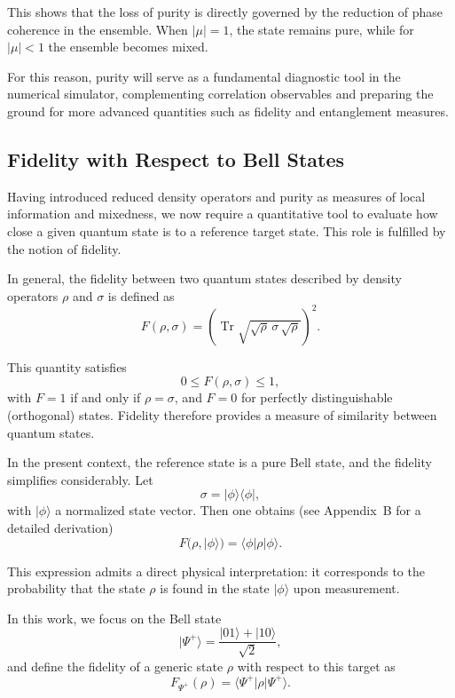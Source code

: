 \documentclass[a4paper]{article}
\begin{document}
This shows that the loss of purity is directly governed by the reduction of phase coherence in the ensemble. When $|\mu|=1$, the state remains pure, while for $|\mu|<1$ the ensemble becomes mixed.

For this reason, purity will serve as a fundamental diagnostic tool in the numerical simulator, complementing correlation observables and preparing the ground for more advanced quantities such as fidelity and entanglement measures.

\subsection{Fidelity with Respect to Bell States}

Having introduced reduced density operators and purity as measures of local information and mixedness, we now require a quantitative tool to evaluate how close a given quantum state is to a reference target state. This role is fulfilled by the notion of fidelity.

In general, the fidelity between two quantum states described by density operators $\rho$ and $\sigma$ is defined as
\[
F(\rho,\sigma)
=
\left(\operatorname{Tr}\sqrt{\sqrt{\rho}\,\sigma\,\sqrt{\rho}}\right)^2.
\]

This quantity satisfies
\[
0 \le F(\rho,\sigma) \le 1,
\]
with $F=1$ if and only if $\rho = \sigma$, and $F=0$ for perfectly distinguishable (orthogonal) states. Fidelity therefore provides a measure of similarity between quantum states.

\medskip

In the present context, the reference state is a pure Bell state, and the fidelity simplifies considerably. Let
\[
\sigma = |\phi\rangle\langle\phi|,
\]
with $|\phi\rangle$ a normalized state vector. Then one obtains (see Appendix~B for a detailed derivation)
\[
F(\rho, |\phi\rangle)
=
\langle \phi | \rho | \phi \rangle.
\]

This expression admits a direct physical interpretation: it corresponds to the probability that the state $\rho$ is found in the state $|\phi\rangle$ upon measurement.

\medskip

In this work, we focus on the Bell state
\[
|\Psi^+\rangle = \frac{|01\rangle + |10\rangle}{\sqrt{2}},
\]
and define the fidelity of a generic state $\rho$ with respect to this target as
\[
F_{\Psi^+}(\rho)
=
\langle \Psi^+ | \rho | \Psi^+ \rangle.
\]

\medskip
\end{document}
